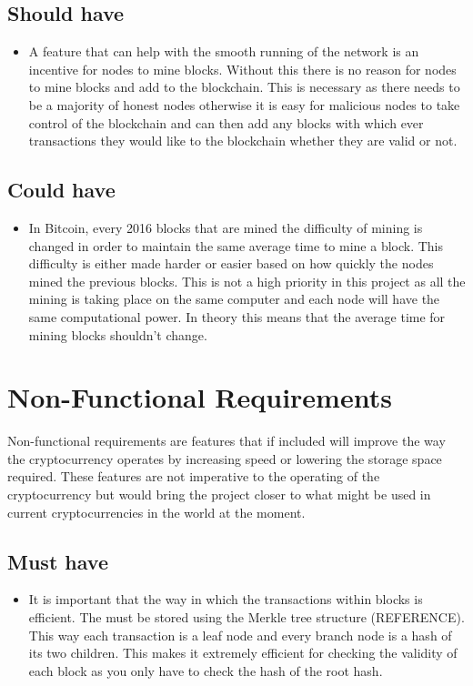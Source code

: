 \documentclass{l4proj}
\begin{document}
\subsection{Should have}
\begin{itemize}
    \item A feature that can help with the smooth running of the network is an incentive for nodes to mine blocks. Without this there
    is no reason for nodes to mine blocks and add to the blockchain. This is necessary as there needs to be a majority of 
    honest nodes otherwise it is easy for malicious nodes to take control of the blockchain and can then add any blocks with
    which ever transactions they would like to the blockchain whether they are valid or not.
\end{itemize}


\subsection{Could have}
\begin{itemize}
    \item In Bitcoin, every 2016 blocks that are mined the difficulty of mining is changed in order to maintain the same average time
    to mine a block. This difficulty is either made harder or easier based on how quickly the nodes mined the previous blocks.
    This is not a high priority in this project as all the mining is taking place on the same computer and each node will have
    the same computational power. In theory this means that the average time for mining blocks shouldn't change.
\end{itemize}


\section{Non-Functional Requirements}
Non-functional requirements are features that if included will improve the way the cryptocurrency operates by increasing
speed or lowering the storage space required. These features are not imperative to the operating of the cryptocurrency
but would bring the project closer to what might be used in current cryptocurrencies in the world at the moment.

\subsection{Must have}
\begin{itemize}
    \item It is important that the way in which the transactions within blocks is efficient. The must be stored using the Merkle
    tree structure (REFERENCE). This way each transaction is a leaf node and every branch node is a hash of its two children.
    This makes it extremely efficient for checking the validity of each block as you only have to check the hash of the root
    hash.
\end{itemize}
\end{document}
